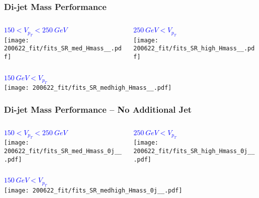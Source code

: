 \documentclass{beamer}
\begin{document}
\begin{frame}
  \frametitle{Di-jet Mass Performance}

  \begin{columns}
    \begin{column}{0.5\linewidth}
      \centering
      \textcolor{blue}{$150 < V_{p_T} < \SI{250}{GeV}$} \\
      \texttt{[image: 200622\_fit/fits\_SR\_med\_Hmass\_\_.pdf]}
    \end{column}
    \begin{column}{0.5\linewidth}
      \centering
      \textcolor{blue}{$\SI{250}{GeV} < V_{p_T}$} \\
      \texttt{[image: 200622\_fit/fits\_SR\_high\_Hmass\_\_.pdf]}
    \end{column}
  \end{columns}

  \centering
  \textcolor{blue}{$\SI{150}{GeV} < V_{p_T}$} \\
  \texttt{[image: 200622\_fit/fits\_SR\_medhigh\_Hmass\_\_.pdf]}

\end{frame}

\begin{frame}
  \frametitle{Di-jet Mass Performance -- No Additional Jet}

  \begin{columns}
    \begin{column}{0.5\linewidth}
      \centering
      \textcolor{blue}{$150 < V_{p_T} < \SI{250}{GeV}$} \\
      \texttt{[image: 200622\_fit/fits\_SR\_med\_Hmass\_0j\_\_.pdf]}
    \end{column}
    \begin{column}{0.5\linewidth}
      \centering
      \textcolor{blue}{$\SI{250}{GeV} < V_{p_T}$} \\
      \texttt{[image: 200622\_fit/fits\_SR\_high\_Hmass\_0j\_\_.pdf]}
    \end{column}
  \end{columns}

  \centering
  \textcolor{blue}{$\SI{150}{GeV} < V_{p_T}$} \\
  \texttt{[image: 200622\_fit/fits\_SR\_medhigh\_Hmass\_0j\_\_.pdf]}

\end{frame}
\end{document}
